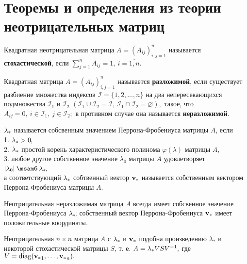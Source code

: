 \section*{Теоремы и определения из теории неотрицательных матриц}

\begin{opr}
Квадратная неотрицательная матрица $A = (A_{ij})_{i,j = 1}^n$ называется \textbf{стохастической}, если
 $\sum_{j=1}^n A_{ij} = 1, \ i = \overline{1, n}.$
\end{opr}

\begin{opr}
Квадратная матрица $A = (A_{ij})_{i,j = 1}^n$ называется \textbf{разложимой}, если существует разбиение множества индексов $\mathcal{I} = \{1, 2, ..., n\}$ на два непересекающихся подмножества $ \mathcal{I}_1$ и $\mathcal{I}_2$ $(\mathcal{I}_1 \cup \mathcal{I}_2 = \mathcal{I}, \ \mathcal{I}_1 \cap \mathcal{I}_2 = \varnothing), $ такое, что $A_{ij} = 0,\  i \in \mathcal{I}_1,\ j \in \mathcal{I}_2;$ в противном случае она называется \textbf{неразложимой}.
\end{opr}

\begin{opr}
${\lambda_\ast}$ называется собсвенным значением Перрона-Фробениуса матрицы $A\!$, если \\
1. ${\lambda_\ast} > 0 \!$,\\
2. ${\lambda_\ast}$ простой корень характеристического полинома $\varphi(\lambda)$ матрицы $A\!$, \\
3. любое другое собственное значение $\lambda_0$ матрицы $A$ удовлетворяет $|\lambda_0| \leq \la \!$, \\
а соответствующий ${\lambda_\ast}$ собтвенный вектор ${\mathbf{v}_\ast}$ называется собственным вектором Перрона-Фробениуса матрицы $A.$
\end{opr}

\begin{ttt}
\label{T-Perr_Fro}
Неотрицательная неразложимая матрица $A$ всегда имеет собсвенное значение Перрона-Фробениуса ${\lambda_\ast}\!$; собственный вектор Перрона-Фробениуса ${\mathbf{v}_\ast}$ имеет положительные координаты.
\end{ttt}

\begin{col}
\label{NEOTR_V_STOCH}
Неотрицательная $n \times n$ матрица $A$ с ${\lambda_\ast}$ и ${\mathbf{v}_\ast}$ подобна произведению $\lambda_\ast$ и некоторой стохастической матрицы $S$, т. е. $A = {\lambda_\ast} VSV^{-1},$ где $V = \mathop{\rm diag}\nolimits({\mathbf{v}_\ast}_1, \ldots, {\mathbf{v}_\ast}_n).$
\end{col}